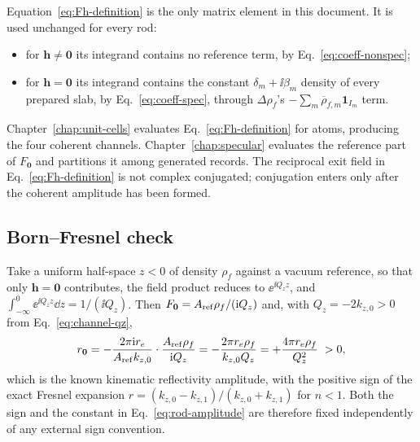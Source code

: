 Equation~\eqref{eq:Fh-definition} is the only matrix element in this document.
It is used unchanged for every rod:
\begin{itemize}
  \item for $\bm h\neq\bm 0$ its integrand contains no reference term, by
        Eq.~\eqref{eq:coeff-nonspec};
  \item for $\bm h=\bm 0$ its integrand contains the constant
        $\delta_m+\ii\beta_m$ density of every prepared slab, by
        Eq.~\eqref{eq:coeff-spec}, through $\Delta\rho_f$'s
        $-\sum_m\overline\rho_{f,m}\mathbf 1_{I_m}$ term.
\end{itemize}
Chapter~\ref{chap:unit-cells} evaluates Eq.~\eqref{eq:Fh-definition} for atoms,
producing the four coherent channels.  Chapter~\ref{chap:specular} evaluates
the reference part of $F_{\bm 0}$ and partitions it among generated records.
The reciprocal exit field in Eq.~\eqref{eq:Fh-definition} is not complex
conjugated; conjugation enters only after the coherent amplitude has been
formed.

\subsection{Born--Fresnel check}
\label{sec:born-check}

Take a uniform half-space $z<0$ of density $\rho_f$ against a vacuum
reference, so that only $\bm h=\bm 0$ contributes, the field product reduces
to $\ee^{\ii Q_zz}$, and
$\int_{-\infty}^{0}\ee^{\ii Q_zz}\dd z=1/(\ii Q_z)$.  Then
$F_{\bm 0}=A_{\rm ref}\rho_f/(\mathrm{i} Q_z)$ and, with $Q_z=-2k_{z,0}>0$ from
Eq.~\eqref{eq:channel-qz},
\begin{equation}
  r_{\bm 0}
  =-\frac{2\pi\mathrm{i} r_e}{A_{\rm ref}k_{z,0}}\cdot
    \frac{A_{\rm ref}\rho_f}{\mathrm{i} Q_z}
  =-\frac{2\pi r_e\rho_f}{k_{z,0}Q_z}
  =+\frac{4\pi r_e\rho_f}{Q_z^{2}}\;>0,
  \label{eq:born-fresnel}
\end{equation}
which is the known kinematic reflectivity amplitude, with the positive sign of
the exact Fresnel expansion $r=(k_{z,0}-k_{z,1})/(k_{z,0}+k_{z,1})$ for $n<1$.
Both the sign and the constant in Eq.~\eqref{eq:rod-amplitude} are therefore
fixed independently of any external sign convention.
